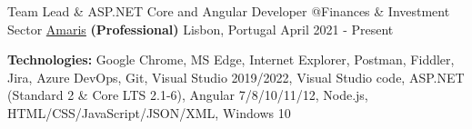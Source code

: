 \begin{cventries}

\vspace{-0.25cm}

  \cventry
    {Team Lead \& ASP.NET Core and Angular Developer @Finances \& Investment Sector %
    } %
    {\href{https://www.amaris.com/}{Amaris} \textbf{(Professional)}} %
    {Lisbon, Portugal} %
    {April 2021 - Present} %
    {
      \begin{cvitems} %
		\item[] {\textbf{Technologies:} 
		\textcolor{rainbowcolor-olive}{Google Chrome}, 
		\textcolor{rainbowcolor-olive}{MS Edge}, 
		\textcolor{rainbowcolor-olive}{Internet Explorer},
		\textcolor{rainbowcolor-olive}{Postman},
		\textcolor{rainbowcolor-olive}{Fiddler}, 
		\textcolor{rainbowcolor-olive}{Jira}, 
		\textcolor{rainbowcolor-olive}{Azure DevOps}, 		
		\textcolor{rainbowcolor-olive}{Git},    
		\textcolor{rainbowcolor-olive}{Visual Studio 2019/2022}, 
		\textcolor{rainbowcolor-olive}{Visual Studio code}, 
		\textcolor{rainbowcolor-indigo}{ASP.NET (Standard 2 \& Core LTS 2.1-6)}, 
		\textcolor{rainbowcolor-indigo}{Angular 7/8/10/11/12}, 	
		\textcolor{rainbowcolor-indigo}{Node.js}, 
		\textcolor{rainbowcolor-indigo}{HTML/CSS/JavaScript/JSON/XML}, 		
		\textcolor{rainbowcolor-orange}{Windows 10}}			
      \end{cvitems}		
    }  
      

\end{cventries}
